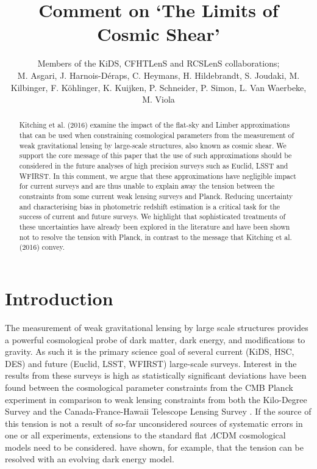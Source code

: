 \documentclass[a4paper, preprint, fleqn, usenatbib]{aastex}
\begin{document}
\title{\huge{Comment on `The Limits of Cosmic Shear'}}

\author{Members of the KiDS, CFHTLenS and RCSLenS collaborations; \\
M. Asgari, J. Harnois-D\'eraps, C. Heymans, H. Hildebrandt, S. Joudaki,  M. Kilbinger, F. K\"ohlinger, K. Kuijken, P. Schneider, P. Simon, L. Van Waerbeke, M. Viola}%


\begin{abstract}
Kitching et al. (2016) examine the impact of the flat-sky and Limber approximations that can be used when constraining cosmological parameters from the measurement of weak gravitational lensing by large-scale structures, also known as cosmic shear.  We support the core message of this paper that the use of such approximations should be considered in the future analyses of high precision surveys such as Euclid, LSST and WFIRST.  In this comment, we argue that these approximations have negligible impact for current surveys and are thus unable to explain away the tension between the constraints from some current weak lensing surveys and Planck.  Reducing uncertainty and characterising bias in photometric redshift estimation is a critical task for the success of current and future surveys.  We highlight that sophisticated treatments of these uncertainties have already been explored in the literature and have been shown not to resolve the tension with Planck, in contrast to the message that Kitching et al. (2016) convey.

\end{abstract}
\section{Introduction}

The measurement of weak gravitational lensing by large scale structures provides a powerful cosmological probe of dark matter, dark energy, and modifications to gravity.  As such it is the primary science goal of several current (KiDS, HSC, DES) and future (Euclid, LSST, WFIRST) large-scale surveys. Interest in the results from these surveys is high as statistically significant deviations have been found between the cosmological parameter constraints from the CMB Planck experiment \citep{planck/cosmo:2015} in comparison to weak lensing constraints from both the Kilo-Degree Survey \citep[KiDS;][]{hildebrandt/etal:2016} and the Canada-France-Hawaii Telescope Lensing Survey \citep[CFHTLenS;][] {joudaki/etal:2016}.  If the source of this tension is not a result of so-far unconsidered sources of systematic errors in one or all experiments, extensions to the standard flat $\Lambda$CDM cosmological models need to be considered.  \citet{joudaki/etal:2017} have shown, for example, that the tension can be resolved with an evolving dark energy model.
\end{document}
